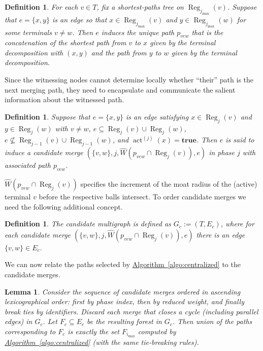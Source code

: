\documentclass[letterpaper,11pt]{article}
\newtheorem{lemma}[theorem]{Lemma}
\newtheorem{definition}[theorem]{Definition}
\newcommand{\namedref}[2]{\hyperref[#2]{#1~\ref*{#2}}}
\newcommand{\algref}[1]{\namedref{Algorithm}{#1}}
\DeclareMathOperator{\act}{act}
\DeclareMathOperator{\reg}{Reg}
\newcommand{\true}{\mathbf{true}}
\begin{document}
\begin{definition}\label{def-induced}
  For each $v\in T$, fix a shortest-paths tree on $\reg_{j_{\max}}(v)$.
  Suppose that $e=\{x,y\}$ is an edge so that $x\in\reg_{j_{\max}}(v)$ and
  $y\in \reg_{j_{\max}}(w)$ for some terminals $v\neq w$. Then $e$
  \emph{induces} the unique path $p_{vew}$ that is the concatenation of the
  shortest path from $v$ to $x$ given by the terminal decomposition with $(x,y)$
  and the path from $y$ to $w$ given by the terminal decomposition.
\end{definition}

Since the witnessing nodes cannot determine locally whether ``their''
path is the next merging path, they need to
encapsulate and communicate the salient information about the witnessed path.

\begin{definition}\label{def-cands}
Suppose that $e=\{x,y\}$ is an edge satisfying $x\in \reg_j(v)$ and
  $y\in\reg_j(w)$ with $v\neq w$, $e\subseteq
  \reg_j(v)\cup \reg_j(w)$, $e\not \subseteq  \reg_{j-1}(v)\cup \reg_{j-1}(w)$, 
   and $\act^{(j)}(x)=\true$. Then $e$ is said to induce a
  \emph{candidate merge} $\left(\{v,w\},j,\hat{W}(p_{vew}\cap
  \reg_j(v)),e\right)$ in phase $j$ with \emph{associated path} $p_{vew}$.
\end{definition}
$\hat{W}(p_{vew}\cap \reg_j(v))$ specifies the
increment of the moat radius of the (active) terminal $v$ before the
respective balls intersect.
To order candidate merges we need the following additional concept.


\begin{definition}\label{def-cand-graph}
The \emph{candidate multigraph} is defined as
$G_c:=(T,E_c)$, where for each candidate merge
$\left(\{v,w\},j,\hat{W}(p_{vew}\cap \reg_j(v)),e\right)$ there is an edge
$\{v,w\}\in E_c$.
\end{definition}

We can now  relate the paths selected by
\algref{algo:centralized} to the candidate merges.

\begin{lemma}\label{lemma:equivalent}
Consider the sequence of candidate merges ordered in
ascending lexicographical order: 
first by phase index, then by reduced weight, and finally break ties by
identifiers.  Discard
each merge that closes a 
cycle (including parallel edges) in $G_c$. Let $F_c\subseteq E_c$ be
the resulting forest in $G_c$. Then union of the paths corresponding
to  $F_c$  is exactly the set $F_{i_{\max}}$
computed by \algref{algo:centralized} (with the same tie-breaking rules).
\end{lemma}
\end{document}
